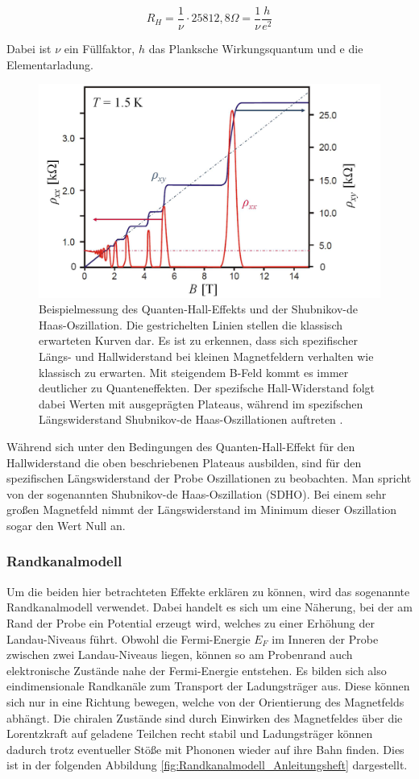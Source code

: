 \begin{equation}
R_H=\frac{1}{\nu}\cdot 25812,8\Omega =\frac{1}{\nu} \frac{h}{e^2}
\label{eq:qh_plateauwerte}
\end{equation}

Dabei ist $\nu$ ein Füllfaktor, $h$ das Planksche Wirkungsquantum und e die Elementarladung. 

\begin{figure}[h]
	\centering
	\includegraphics[width=0.5\linewidth]{images/Anleitungsheft/QH_Bsp_Messung_Anleitungsheft.png}
	\caption[Beispiel-Messung Hall-Plateaus und SDH-Oszillation]{Beispielmessung des Quanten-Hall-Effekts und der Shubnikov-de Haas-Oszillation. Die gestrichelten Linien stellen die klassisch erwarteten Kurven dar. Es ist zu erkennen, dass sich spezifischer Längs- und Hallwiderstand bei kleinen Magnetfeldern verhalten wie klassisch zu erwarten. Mit steigendem B-Feld kommt es immer deutlicher zu Quanteneffekten. Der spezifsche Hall-Widerstand folgt dabei Werten mit ausgeprägten Plateaus, während im spezifschen Längswiderstand Shubnikov-de Haas-Oszillationen auftreten \cite{anleitung}.}
	\label{fig:QH_Bsp_Messung_Anleitungsheft}
\end{figure}

Während sich unter den Bedingungen des Quanten-Hall-Effekt für den Hallwiderstand die oben beschriebenen Plateaus ausbilden, sind für den spezifischen Längswiderstand der Probe Oszillationen zu beobachten. Man spricht von der sogenannten Shubnikov-de Haas-Oszillation (SDHO). Bei einem sehr großen Magnetfeld nimmt der Längswiderstand im Minimum dieser Oszillation sogar den Wert Null an.

\subsubsection{Randkanalmodell}

Um die beiden hier betrachteten Effekte erklären zu können, wird das sogenannte Randkanalmodell verwendet. Dabei handelt es sich um eine Näherung, bei der am Rand der Probe ein Potential erzeugt wird, welches zu einer Erhöhung der Landau-Niveaus führt. Obwohl die Fermi-Energie $E_F$ im Inneren der Probe zwischen zwei Landau-Niveaus liegen, können so am Probenrand auch elektronische Zustände nahe der Fermi-Energie entstehen. Es bilden sich also eindimensionale Randkanäle zum Transport der Ladungsträger aus. Diese können sich nur in eine Richtung bewegen, welche von der Orientierung des Magnetfelds abhängt. Die chiralen Zustände sind durch Einwirken des Magnetfeldes über die Lorentzkraft auf geladene Teilchen recht stabil und Ladungsträger können dadurch trotz  eventueller Stöße mit Phononen wieder auf ihre Bahn finden. Dies ist in der folgenden Abbildung \ref{fig:Randkanalmodell_Anleitungsheft} dargestellt.

